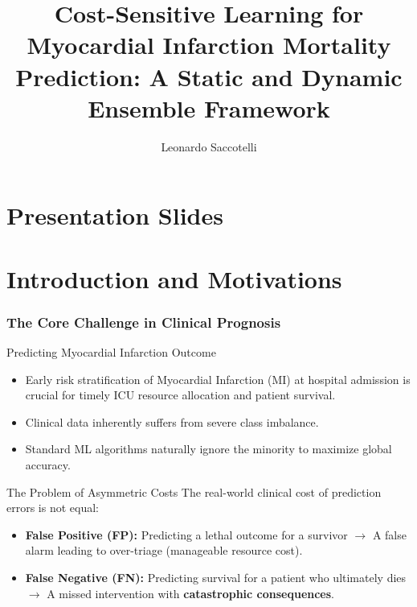 \documentclass[aspectratio=169,xcolor=dvipsnames]{beamer}
\title{Cost-Sensitive Learning for Myocardial Infarction Mortality Prediction: A Static and Dynamic Ensemble Framework}
\subtitle{} %
\author{Leonardo Saccotelli}
\institute{Università degli Studi di Bari Aldo Moro}
\date{} %
\begin{document}
\section{Presentation Slides}

\begin{frame}
    \titlepage
    
\end{frame}



\section{Introduction and Motivations}

\begin{frame}

\frametitle{The Core Challenge in Clinical Prognosis}

    \begin{block}{Predicting Myocardial Infarction Outcome}
    	\begin{itemize}
            \item Early risk stratification of Myocardial Infarction (MI) at hospital admission is crucial for timely ICU resource allocation and patient survival.
            \item Clinical data inherently suffers from severe class imbalance.
            \item Standard ML algorithms naturally ignore the minority to maximize global accuracy.
        \end{itemize}  
	\end{block}
    
    \begin{block}{The Problem of Asymmetric Costs}
The real-world clinical cost of prediction errors is not equal:
        \begin{itemize}
            \item \textbf{False Positive (FP):} Predicting a lethal outcome for a survivor $\rightarrow$ A false alarm leading to over-triage (manageable resource cost).
            \item \textbf{False Negative (FN):} Predicting survival for a patient who ultimately dies $\rightarrow$ A missed intervention with \textbf{catastrophic consequences}.
        \end{itemize}
    \end{block}

\end{frame}
\end{document}
